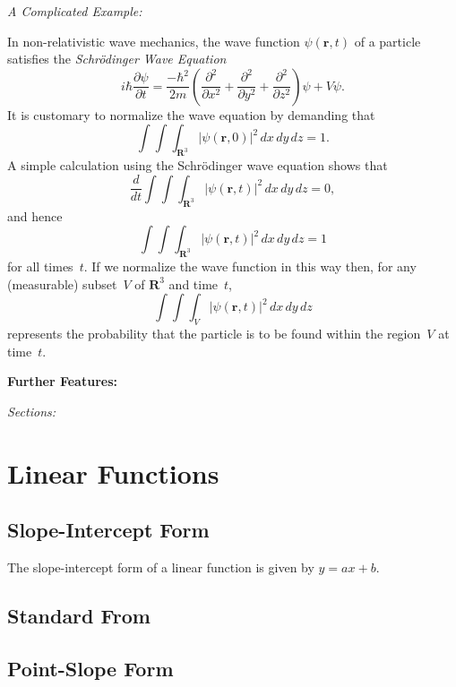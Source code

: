 \documentclass[12pt]{article}
\begin{document}
\noindent
\begin{large}\textit{A Complicated Example:}\end{large}

In non-relativistic wave mechanics, the wave function $\psi(\mathbf{r},t)$ of a particle satisfies the \textit{Schr\"{o}dinger Wave Equation}
\[ i\hbar\frac{\partial \psi}{\partial t}
  = \frac{-\hbar^2}{2m} \left(
    \frac{\partial^2}{\partial x^2}
    + \frac{\partial^2}{\partial y^2}
    + \frac{\partial^2}{\partial z^2} \right)
    \psi + V \psi.\]
It is customary to normalize the wave equation by demanding that 
\[ \int \!\!\! \int \!\!\! \int_{\textbf{R}^3}
	\left| \psi(\mathbf{r},0) \right|^2\,dx\,dy\,dz = 1.\]
A simple calculation using the Schr\"{o}dinger wave equation shows that
\[ \frac{d}{dt} \int \!\!\! \int \!\!\! \int_{\textbf{R}^3}
	\left| \psi(\mathbf{r},t) \right|^2\,dx\,dy\,dz = 0,\]
and hence 
\[ \int \!\!\! \int \!\!\! \int_{\textbf{R}^3}
	\left| \psi(\mathbf{r},t) \right|^2\,dx\,dy\,dz = 1\]
for all times~$t$. If we normalize the wave function in this way then, for any (measurable) subset~$V$ of $\textbf{R}^3$ and time~$t$,
\[ \int \!\!\! \int \!\!\! \int_V
	\left| \psi(\mathbf{r},t) \right|^2\,dx\,dy\,dz\]
represents the probability that the particle is to be found within the region~$V$ at time~$t$. \\

\bigbreak
\noindent
\begin{Large}\textbf{Further Features:}\end{Large} 
\bigbreak

\noindent
\begin{large}\textit{Sections:}\end{large}

\section{Linear Functions}
\subsection{Slope-Intercept Form}
The slope-intercept form of a linear function is given by $y=ax+b$.
\subsection{Standard From}
\subsection{Point-Slope Form}
\end{document}
